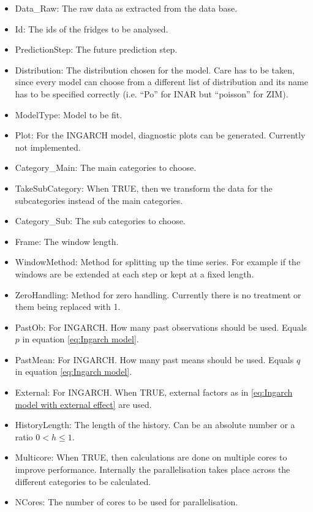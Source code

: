\begin{itemize}
	\item Data\_Raw: The raw data as extracted from the data base.
  \item Id: The ids of the fridges to be analysed.
  \item PredictionStep: The future prediction step.
  \item Distribution: The distribution chosen for the model. Care has to be taken, since every model can choose from a different list of distribution and its name has to be specified correctly (i.e. "`Po"' for INAR but "`poisson"' for ZIM).
  \item ModelType: Model to be fit. 
  \item Plot: For the INGARCH model, diagnostic plots can be generated. Currently not implemented.
  \item Category\_Main: The main categories to choose. 
  \item TakeSubCategory: When TRUE, then we transform the data for the subcategories instead of the main categories. 
  \item Category\_Sub: The sub categories to choose.
  \item Frame: The window length.
  \item WindowMethod: Method for splitting up the time series. For example if the windows are be extended at each step or kept at a fixed length.
  \item ZeroHandling: Method for zero handling. Currently there is no treatment or them being replaced with 1. 
  \item PastOb: For INGARCH. How many past observations should be used. Equals $p$ in equation \ref{eq:Ingarch model}.
  \item PastMean: For INGARCH. How many past means should be used. Equals $q$ in equation \ref{eq:Ingarch model}.
  \item External: For INGARCH. When TRUE, external factors as in \ref{eq:Ingarch model with external effect} are used.
  \item HistoryLength: The length of the history. Can be an absolute number or a ratio $0<h\leq 1$.
  \item Multicore: When TRUE, then calculations are done on multiple cores to improve performance. Internally the parallelisation takes place across the different categories to be calculated. 
  \item NCores: The number of cores to be used for parallelisation. 
\end{itemize}

